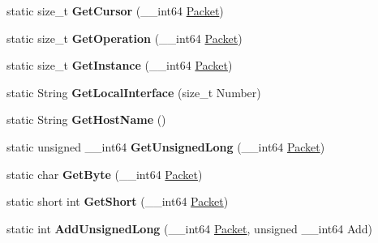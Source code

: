\begin{DoxyCompactItemize}
\item 
\hypertarget{structmn_c_l_r_a72c9582e9573e04e8702a7c05b908039}{
static size\_\-t {\bfseries GetCursor} (\_\-\_\-int64 \hyperlink{class_packet}{Packet})}
\label{structmn_c_l_r_a72c9582e9573e04e8702a7c05b908039}

\item 
\hypertarget{structmn_c_l_r_ad9534cdb70719fa188e1692ccf170b69}{
static size\_\-t {\bfseries GetOperation} (\_\-\_\-int64 \hyperlink{class_packet}{Packet})}
\label{structmn_c_l_r_ad9534cdb70719fa188e1692ccf170b69}

\item 
\hypertarget{structmn_c_l_r_a78f23ea4392aa280de5154112ba01521}{
static size\_\-t {\bfseries GetInstance} (\_\-\_\-int64 \hyperlink{class_packet}{Packet})}
\label{structmn_c_l_r_a78f23ea4392aa280de5154112ba01521}

\item 
\hypertarget{structmn_c_l_r_ad2fc23365688ccbe400d7488b855c0a4}{
static String {\bfseries GetLocalInterface} (size\_\-t Number)}
\label{structmn_c_l_r_ad2fc23365688ccbe400d7488b855c0a4}

\item 
\hypertarget{structmn_c_l_r_af8eba8b0b8befc870257bed4c20bcc5a}{
static String {\bfseries GetHostName} ()}
\label{structmn_c_l_r_af8eba8b0b8befc870257bed4c20bcc5a}

\item 
\hypertarget{structmn_c_l_r_a6f6401a2806c25a5df5f014a4c72eb44}{
static unsigned \_\-\_\-int64 {\bfseries GetUnsignedLong} (\_\-\_\-int64 \hyperlink{class_packet}{Packet})}
\label{structmn_c_l_r_a6f6401a2806c25a5df5f014a4c72eb44}

\item 
\hypertarget{structmn_c_l_r_a667a327b2b6699b447f9c5220230ce70}{
static char {\bfseries GetByte} (\_\-\_\-int64 \hyperlink{class_packet}{Packet})}
\label{structmn_c_l_r_a667a327b2b6699b447f9c5220230ce70}

\item 
\hypertarget{structmn_c_l_r_a66684e2c404faa71ec5eeb5c552797d0}{
static short int {\bfseries GetShort} (\_\-\_\-int64 \hyperlink{class_packet}{Packet})}
\label{structmn_c_l_r_a66684e2c404faa71ec5eeb5c552797d0}

\item 
\hypertarget{structmn_c_l_r_aef3d5d008f451595e234431050bfa89a}{
static int {\bfseries AddUnsignedLong} (\_\-\_\-int64 \hyperlink{class_packet}{Packet}, unsigned \_\-\_\-int64 Add)}
\label{structmn_c_l_r_aef3d5d008f451595e234431050bfa89a}


\end{DoxyCompactItemize}
